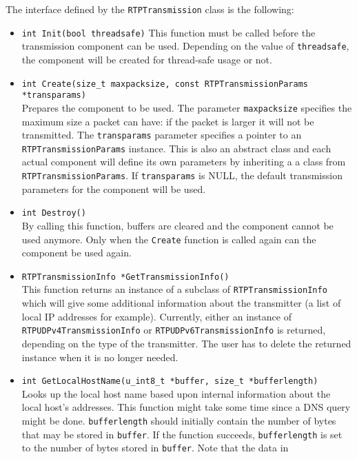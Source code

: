 \documentclass[12pt,a4paper]{article}
\begin{document}
				The interface defined by the {\tt RTPTransmission} class is the
				following:
				\begin{itemize}
					\item {\tt int Init(bool threadsafe)}
						This function must be called before the transmission component
						can be used. Depending on the value of {\tt threadsafe}, the
						component will be created for thread-safe usage or not.
					\item {\tt int Create(size\_t maxpacksize, const RTPTransmissionParams *transparams)}\\
						Prepares the component to be used. The parameter {\tt maxpacksize}
						specifies the maximum size a packet can have: if the packet
						is larger it will not be transmitted. The {\tt transparams}
						parameter specifies a pointer to an {\tt RTPTransmissionParams}
						instance. This is also an abstract class and each actual
						component will define its own parameters by inheriting a
						a class from {\tt RTPTransmissionParams}. If {\tt transparams}
						is NULL, the default transmission parameters for the component
						will be used.
					\item {\tt int Destroy()}\\
						By calling this function, buffers are cleared and the component
						cannot be used anymore. Only when the {\tt Create} function is
						called again can the component be used again.
					\item {\tt RTPTransmissionInfo *GetTransmissionInfo()}\\
					    This function returns an instance of a subclass of {\tt RTPTransmissionInfo}
						which will give some additional information about the transmitter
						(a list of local IP addresses for example). Currently, either
						an instance of {\tt RTP\-UDPv4\-Trans\-mission\-Info} or {\tt RTP\-UDPv6\-Trans\-mission\-Info}
						is returned, depending on the type of the transmitter. The user
						has to delete the returned instance when it is no longer needed.
					\item {\tt int GetLocalHostName(u\_int8\_t *buffer, size\_t *bufferlength)}\\
						Looks up the local host name based upon internal information about
						the local host's addresses. This function might take some time
						since a DNS query might be done. {\tt bufferlength} should initially
						contain the number of bytes that may be stored in {\tt buffer}.
						If the function succeeds, {\tt bufferlength} is set to the 
						number of bytes stored in {\tt buffer}. Note that the data in

\end{itemize}
\end{document}

